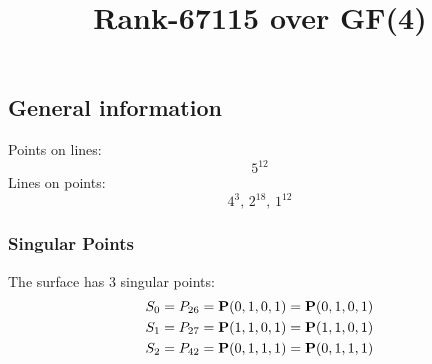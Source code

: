 \documentclass{article}
\newcommand\setTBstruts{\def\T{\rule{0pt}{2.6ex}}%
\def\B{\rule[-1.2ex]{0pt}{0pt}}}
\newcommand{\bP}{{\bf P}}
\begin{document}
 
\setTBstruts



{\allowdisplaybreaks%






\title{Rank-67115 over GF(4)}
\author{}%
\maketitle%
%
{}



\subsection*{General information}
Points on lines:
$$
5^{12}$$
Lines on points:
$$
4^3,\,2^{18},\,1^{12}$$
\subsubsection*{Singular Points}
The surface has 3 singular points:\\
\begin{align*}
S_{0} &= P_{26}=\bP(0, 1, 0, 1) = \bP(0, 1, 0, 1)\\
S_{1} &= P_{27}=\bP(1, 1, 0, 1) = \bP(1, 1, 0, 1)\\
S_{2} &= P_{42}=\bP(0, 1, 1, 1) = \bP(0, 1, 1, 1)\\
\end{align*}
}
\end{document}
